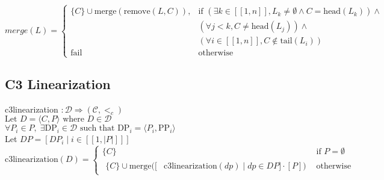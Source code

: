 \documentclass{article}
\begin{document}
\[
merge(L) =
\begin{cases}
\{C\} \cup \text{merge}(\text{remove}(L, C)), & \text{if } (\exists k \in [\![1,n]\!], L_k \neq \emptyset \land C = \text{head}(L_k)) \land \\
& (\forall j < k, C \neq \text{head}(L_j)) \land \\ 
& (\forall i \in [\![1,n]\!],C \notin \text{tail}(L_i)) \\ 

\text{fail}  & \text{otherwise}
\end{cases}
\]

\vspace{2cm}
\subsection*{C3 Linearization}
c3linearization $: \mathcal{D} \Rightarrow (\mathcal{C},<_c)$\\
$\text{Let } D = \langle C, P \rangle \text{ where } D \in \mathcal{D}$\\
$\forall P_i \in P, \; \exists \text{DP}_i \in \mathcal{D} \text{ such that } \text{DP}_i = \langle P_i, \text{PP}_i \rangle$\\
Let $DP = [DP_i \mid i \in  [\![1, |P|]\!] ]$\\
\[
\text{c3linearization}(D) =
\begin{cases}
\{C\} & \text{if } P = \emptyset \\
\begin{split}
\{C\} \cup \text{merge}([&\text{c3linearization}(dp) \mid dp \in DP] \cdot [P]) 
\end{split} & \text{otherwise}
\end{cases}
\]
\end{document}
